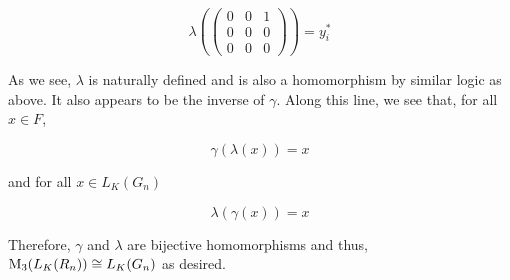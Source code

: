 \begin{solution}
    $$\lambda(\left(\begin{array}{ccc} 0 & 0 & 1 \\ 0 & 0 & 0 \\ 0 & 0 & 0 \end{array}\right))=y_i^*$$

    As we see, $\lambda$ is naturally defined and is also a homomorphism by similar logic as above. It
    also appears to be the inverse of $\gamma$. Along this line, we see that, for all $x\in F$,

    $$\gamma(\lambda(x))=x$$

    and for all $x\in L_K(G_n)$

    $$\lambda(\gamma(x))=x$$

    Therefore, $\gamma$ and $\lambda$ are bijective homomorphisms and thus,
    ${\rm M}_3(L_K(R_n))\cong L_K(G_n)$ as desired.


\end{solution}

